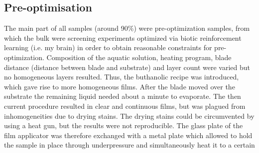 \subsection{Pre-optimisation}\label{sec:exp-preopt}
The main part of all samples (around 90\%) were pre-optimization samples, 
from which the bulk were screening experiments optimized via biotic reinforcement learning 
(i.e. my brain) in order to obtain reasonable constraints for pre-optimization. 
Composition of the aquatic solution, heating program, blade distance (distance between 
blade and substrate) and layer count were varied but no homogeneous layers resulted. 
Thus, 
the buthanolic recipe was introduced, which gave rise to more homogeneous films.
After the blade moved over the substrate the remaining liquid needed about a minute 
to evaporate. 
The then current procedure resulted in clear and continuous films, but was plagued from 
inhomogeneities due to drying stains. 
The drying stains could be circumvented by using a heat gun, but the results were not 
reproducible. 
The glass plate of the film applicator was therefore exchanged with a metal plate which 
allowed to hold the sample in place through underpressure and simultaneously heat it to a certain 
